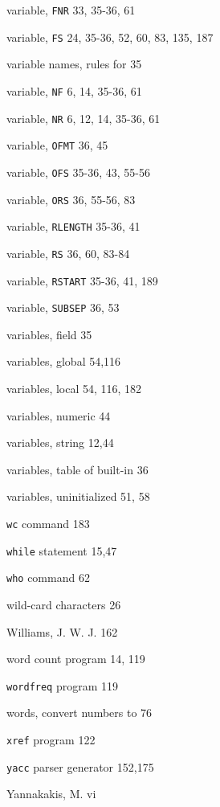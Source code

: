 \begin{multicols}{3}
\hangindent=4pc  variable, \verb'FNR' 33, 35-36, 61

\hangindent=4pc  variable, \verb'FS' 24, 35-36, 52, 60, 83, 135, 187

\hangindent=4pc  variable names, rules for 35

\hangindent=4pc  variable, \verb'NF' 6, 14, 35-36, 61

\hangindent=4pc  variable, \verb'NR' 6, 12, 14, 35-36, 61

\hangindent=4pc  variable, \verb'OFMT' 36, 45

\hangindent=4pc  variable, \verb'OFS' 35-36, 43, 55-56

\hangindent=4pc  variable, \verb'ORS' 36, 55-56, 83

\hangindent=4pc  variable, \verb'RLENGTH' 35-36, 41

\hangindent=4pc  variable, \verb'RS' 36, 60, 83-84

\hangindent=4pc  variable, \verb'RSTART' 35-36, 41, 189

\hangindent=4pc  variable, \verb'SUBSEP' 36, 53

\hangindent=4pc  variables, field 35

\hangindent=4pc  variables, global 54,116

\hangindent=4pc  variables, local 54, 116, 182

\hangindent=4pc  variables, numeric 44

\hangindent=4pc  variables, string 12,44

\hangindent=4pc  variables, table of built-in 36

\hangindent=4pc  variables, uninitialized 51, 58

\hangindent=4pc  \verb'wc' command 183

\hangindent=4pc  \verb'while' statement 15,47

\hangindent=4pc  \verb'who' command 62

\hangindent=4pc  wild-card characters 26

\hangindent=4pc  Williams, J. W. J. 162

\hangindent=4pc  word count program 14, 119

\hangindent=4pc  \verb'wordfreq' program 119

\hangindent=4pc  words, convert numbers to 76

\hangindent=4pc  \verb'xref' program 122

\hangindent=4pc  \verb'yacc' parser generator 152,175

\hangindent=4pc  Yannakakis, M. vi

\end{multicols}
